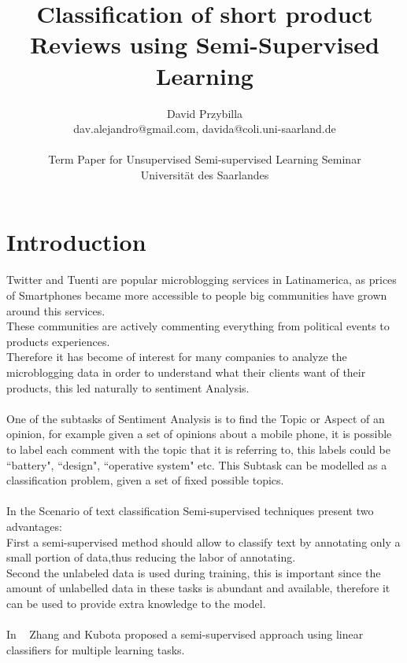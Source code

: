 \documentclass[4pt,a4paper,twocolumn]{article}
\author{David Przybilla\\dav.alejandro@gmail.com, davida@coli.uni-saarland.de\\ \\ Term Paper for Unsupervised Semi-supervised
Learning Seminar\\ Universit\"{a}t des Saarlandes}
\title{Classification of short product Reviews using Semi-Supervised Learning}
\begin{document}
\twocolumn[
	 \begin{@twocolumnfalse}
    \maketitle
   \begin{abstract}
      ...
    \end{abstract}
  \end{@twocolumnfalse}
 ]



\section{Introduction}
Twitter and Tuenti are popular microblogging services in Latinamerica,
as prices of Smartphones became more accessible to people big communities
have grown around this services.\\
These communities are actively commenting everything from political events to products experiences.\\
Therefore it has become of interest for many companies to analyze the microblogging data in order to understand
what their clients want of their products, this led naturally to sentiment Analysis.\\ 
\\
One of the subtasks of Sentiment Analysis is to find the Topic or Aspect of an opinion,
for example given a set of opinions about a mobile phone, it is possible to label each comment
with the topic that it is referring to, this labels could be ``battery", ``design", ``operative system" etc.
This Subtask can be modelled as a classification problem, given a set of fixed possible topics.\\
\\
In the Scenario of text classification Semi-supervised techniques present two advantages:\\
First a semi-supervised method should allow to classify text by annotating only a small portion of data,thus reducing the labor of annotating.\\
Second the unlabeled data is used during training, this is important since the amount of unlabelled data in these tasks is abundant and available, therefore it can be used to provide extra knowledge to the model.\\
\\
In ~\cite{Ando:2005:FLP:1046920.1194905} Zhang and Kubota proposed a semi-supervised approach using linear classifiers for multiple learning tasks.\\
\end{document}
